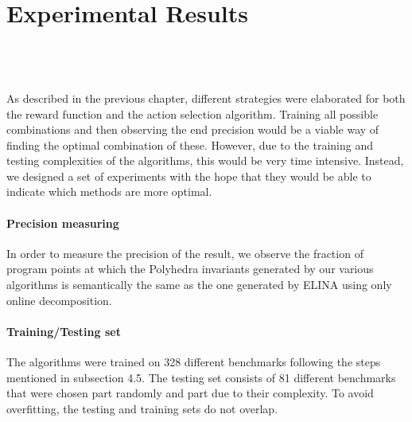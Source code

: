 
\chapter{Experimental Results}
\mbox{}\\
\mbox{}\\
\mbox{}\\
As described in the previous chapter, different strategies were elaborated for both the reward function and the action selection algorithm. Training all possible combinations and then observing the end precision would be a viable way of finding the optimal combination of these. However, due to the training and testing complexities of the algorithms, this would be very time intensive. Instead, we designed a set of experiments with the hope that they would be able to indicate which methods are more optimal.
\subsubsection{Precision measuring}
In order to measure the precision of the result, we observe the fraction of program points at which the Polyhedra invariants generated by our various algorithms is semantically the same as the one generated by ELINA using only online decomposition.
\subsubsection{Training/Testing set}
The algorithms were trained on 328 different benchmarks following the steps mentioned in subsection 4.5. The testing set consists of 81 different benchmarks that were chosen part randomly and part due to their complexity. To avoid overfitting, the testing and training sets do not overlap.


